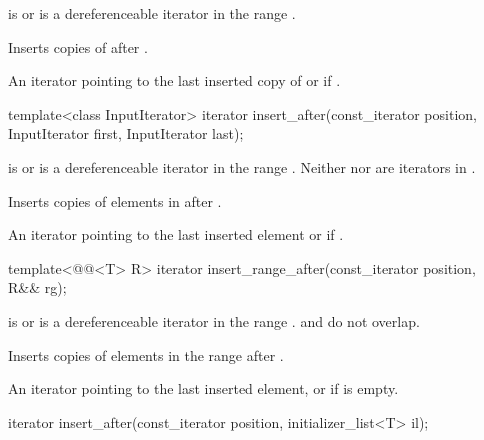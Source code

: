 \begin{itemdescr}
\pnum
\expects
{} is  or is a dereferenceable
iterator in the range .

\pnum
\effects
Inserts  copies of  after .

\pnum
\returns
An iterator pointing to the last inserted copy of  or  if .
\end{itemdescr}

%
\begin{itemdecl}
template<class InputIterator>
  iterator insert_after(const_iterator position, InputIterator first, InputIterator last);
\end{itemdecl}

\begin{itemdescr}
\pnum
\expects
{} is  or is a dereferenceable
iterator in the range .
Neither  nor  are iterators in .

\pnum
\effects
Inserts copies of elements in  after .

\pnum
\returns
An iterator pointing to the last inserted element or  if .
\end{itemdescr}

%
\begin{itemdecl}
template<@@<T> R>
  iterator insert_range_after(const_iterator position, R&& rg);
\end{itemdecl}

\begin{itemdescr}
\pnum
\expects
{} is  or
is a dereferenceable iterator in the range .
 and  do not overlap.

\pnum
\effects
Inserts copies of elements in the range  after .

\pnum
\returns
An iterator pointing to the last inserted element,
or  if  is empty.
\end{itemdescr}

%
\begin{itemdecl}
iterator insert_after(const_iterator position, initializer_list<T> il);
\end{itemdecl}

